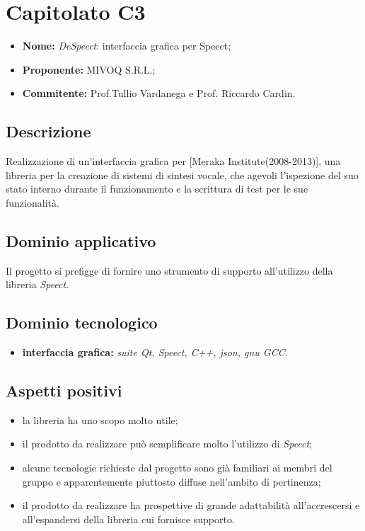 \documentclass[openany,12pt,a4paper]{report}
\begin{document}
	\section{Capitolato C3}
	
	\begin{itemize}
		\item \textbf{Nome:} \textit{DeSpeect}: interfaccia grafica per Speect;
		\item \textbf{Proponente:} MIVOQ S.R.L.;
		\item \textbf{Commitente:} Prof.Tullio Vardanega e Prof. Riccardo Cardin.
	\end{itemize}
	
	\subsection{Descrizione}
	
	Realizzazione di un'interfaccia grafica per  [Meraka Institute(2008-2013)], una libreria per la creazione di sistemi di sintesi vocale, che agevoli l’ispezione del suo stato interno durante il funzionamento e la scrittura di test per le sue funzionalità.
	
	
	\subsection{Dominio applicativo}
	
	Il progetto si prefigge di fornire uno strumento di supporto all'utilizzo della libreria \textit{Speect}.
	
	\subsection{Dominio tecnologico}
	
	\begin{itemize}
		\item \textbf{interfaccia grafica:} \textit{suite Qt, Speect, C++, json, gnu GCC.}
	\end{itemize}
	
	\subsection{Aspetti positivi}
	
	\begin{itemize}
		\item la libreria ha uno scopo molto utile;
		
		\item il prodotto da realizzare può semplificare molto l'utilizzo di \textit{Speect};
		
		\item alcune tecnologie richieste dal progetto sono già familiari ai membri del gruppo e apparentemente piuttosto diffuse nell'ambito di pertinenza;
		
		\item il prodotto da realizzare ha prospettive di grande adattabilità all'accrescersi e all'espandersi della libreria cui fornisce supporto.
	\end{itemize}
	
\end{document}
